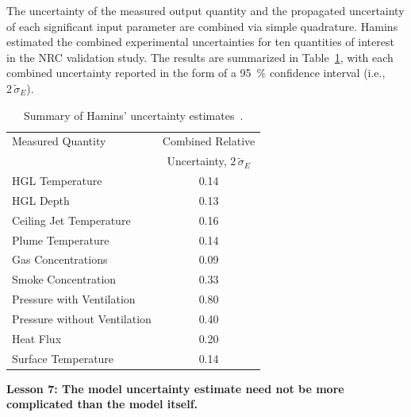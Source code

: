 \documentclass[fleqn,b5paper]{article}
\begin{document}
The uncertainty of the measured output quantity and the propagated uncertainty of each significant input parameter are combined via simple quadrature.  Hamins estimated the combined experimental uncertainties for ten quantities of interest in the NRC validation study. The results are summarized in Table~\ref{Uncertainty}, with each combined uncertainty reported in the form of a 95~\% confidence interval (i.e., $2 \, \widetilde{\sigma}_E$).
\begin{table}[ht]
\caption{Summary of Hamins' uncertainty estimates~\cite{NUREG_1824}. }
\begin{center}
\begin{tabular}{|l|c|}
\hline
Measured Quantity               & Combined Relative       \\
                                & Uncertainty, $2 \, \widetilde{\sigma}_E$       \\ \hline \hline
HGL Temperature                 & 0.14    \\ \hline
HGL Depth                       & 0.13    \\ \hline
Ceiling Jet Temperature         & 0.16    \\ \hline
Plume Temperature               & 0.14    \\ \hline
Gas Concentrations              & 0.09    \\ \hline
Smoke Concentration             & 0.33    \\ \hline
Pressure with Ventilation       & 0.80    \\ \hline
Pressure without Ventilation    & 0.40    \\ \hline
Heat Flux                       & 0.20    \\ \hline
Surface Temperature             & 0.14    \\ \hline
\end{tabular}
\end{center}
\label{Uncertainty}
\end{table}



\vspace{\parskip}
{\bf Lesson 7: The model uncertainty estimate need not be more complicated than the model itself.}
\end{document}
